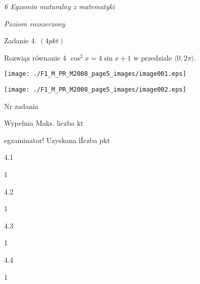 \documentclass[a4paper,12pt]{article}
\begin{document}
{\it 6 Egzamin maturalny z matematyki}

{\it Poziom rozszerzony}

Zadanie 4. $(4pkt)$

Rozwiąz równanie 4 $\cos^{2}x=4\sin x+1$ w przedziale $\langle 0,2\pi\rangle.$
\begin{center}
\texttt{[image: ./F1\_M\_PR\_M2008\_page5\_images/image001.eps]}

\texttt{[image: ./F1\_M\_PR\_M2008\_page5\_images/image002.eps]}
\end{center}
Nr zadania

Wypelnia Maks. liczba kt

egzaminator! Uzyskana lÍczba pkt

4.1

1

4.2

1

4.3

1

4.4

1
\end{document}
